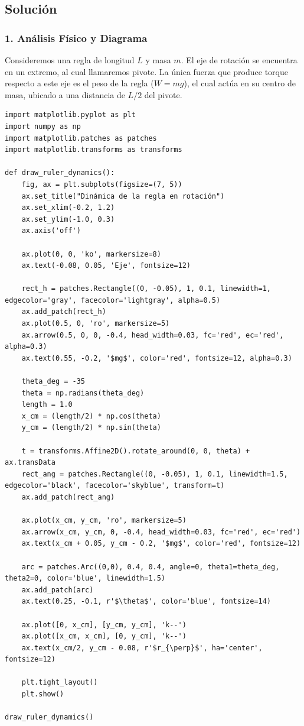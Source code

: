 \documentclass[12pt, a4paper]{article}
\begin{document}
\subsection*{Solución}

\subsubsection*{1. Análisis Físico y Diagrama}
Consideremos una regla de longitud $L$ y masa $m$. El eje de rotación se encuentra en un extremo, al cual llamaremos pivote. La única fuerza que produce torque respecto a este eje es el peso de la regla ($W = mg$), el cual actúa en su centro de masa, ubicado a una distancia de $L/2$ del pivote.

\begin{lstlisting}
import matplotlib.pyplot as plt
import numpy as np
import matplotlib.patches as patches
import matplotlib.transforms as transforms

def draw_ruler_dynamics():
    fig, ax = plt.subplots(figsize=(7, 5))
    ax.set_title("Dinámica de la regla en rotación")
    ax.set_xlim(-0.2, 1.2)
    ax.set_ylim(-1.0, 0.3)
    ax.axis('off')

    ax.plot(0, 0, 'ko', markersize=8)
    ax.text(-0.08, 0.05, 'Eje', fontsize=12)

    rect_h = patches.Rectangle((0, -0.05), 1, 0.1, linewidth=1, edgecolor='gray', facecolor='lightgray', alpha=0.5)
    ax.add_patch(rect_h)
    ax.plot(0.5, 0, 'ro', markersize=5)
    ax.arrow(0.5, 0, 0, -0.4, head_width=0.03, fc='red', ec='red', alpha=0.3)
    ax.text(0.55, -0.2, '$mg$', color='red', fontsize=12, alpha=0.3)

    theta_deg = -35
    theta = np.radians(theta_deg)
    length = 1.0
    x_cm = (length/2) * np.cos(theta)
    y_cm = (length/2) * np.sin(theta)

    t = transforms.Affine2D().rotate_around(0, 0, theta) + ax.transData
    rect_ang = patches.Rectangle((0, -0.05), 1, 0.1, linewidth=1.5, edgecolor='black', facecolor='skyblue', transform=t)
    ax.add_patch(rect_ang)

    ax.plot(x_cm, y_cm, 'ro', markersize=5)
    ax.arrow(x_cm, y_cm, 0, -0.4, head_width=0.03, fc='red', ec='red')
    ax.text(x_cm + 0.05, y_cm - 0.2, '$mg$', color='red', fontsize=12)

    arc = patches.Arc((0,0), 0.4, 0.4, angle=0, theta1=theta_deg, theta2=0, color='blue', linewidth=1.5)
    ax.add_patch(arc)
    ax.text(0.25, -0.1, r'$\theta$', color='blue', fontsize=14)

    ax.plot([0, x_cm], [y_cm, y_cm], 'k--')
    ax.plot([x_cm, x_cm], [0, y_cm], 'k--')
    ax.text(x_cm/2, y_cm - 0.08, r'$r_{\perp}$', ha='center', fontsize=12)

    plt.tight_layout()
    plt.show()

draw_ruler_dynamics()
\end{lstlisting}
\end{document}

